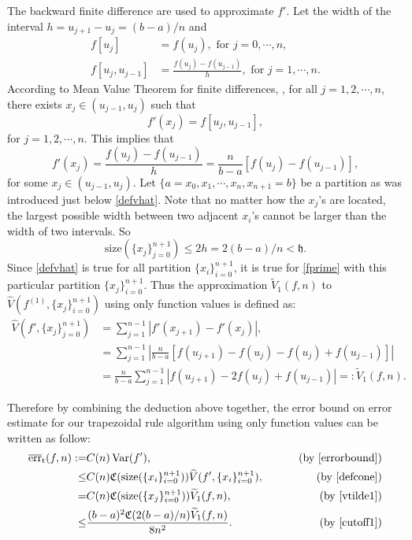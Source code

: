 \documentclass{iitthesis}
\DeclareMathOperator{\Var}{Var}
\theoremstyle{definition}
\theoremstyle{remark}
\begin{document}

The backward finite difference are used to approximate $f'$. Let the width of the interval $h=u_{j+1}-u_{j}=(b-a)/n$ and
\begin{align*}
  f[u_{j}]&=f(u_{j}), \text{ for } j=0,\cdots, n,\\
  f[u_{j},u_{j-1}]&=\frac{f(u_{j})-f(u_{j-1})}{h},\text{ for } j=1, \cdots, n.
\end{align*}
According to Mean Value Theorem for finite differences, , for all $j=1,2,\cdots,n$, there exists $x_j\in (u_{j-1},u_{j})$ such that
\begin{equation*}
   f'(x_j)= f[u_{j},u_{j-1}],
\end{equation*}
for $j = 1, 2, \cdots, n.$ This implies that
\begin{equation}\label{fprime}
  f'(x_j)=\frac{f(u_{j})-f(u_{j-1})}{h}=\frac{n}{b-a}[f(u_{j})-f(u_{j-1})],
\end{equation}
for some $x_j\in (u_{j-1},u_{j})$. Let $\{a=x_{0}, x_{1},\cdots,x_{n},x_{n+1}=b\}$ be a partition as was introduced just below \eqref{defvhat}. Note that no matter how the $x_j$'s are located, the largest possible width between two adjacent $x_{i}$'s cannot be larger than the width of two intervals. So
\begin{equation}\label{cutoff1}
  \text{size}(\{x_j\}_{j=0}^{n+1})\leq 2h=2(b-a)/n<\mathfrak{h}.
\end{equation}
Since \eqref{defvhat} is true for all partition $\{x_i\}_{i=0}^{n+1}$, it is true for \eqref{fprime} with this particular partition $\{x_j\}_{i=0}^{n+1}$. Thus the approximation $\widetilde{V}_1(f,n)$ to $\widehat{V}(f^{(1)},\{x_j\}_{i=0}^{n+1})$ using only function values is defined as:
\begin{align}\label{vtilde1}
\nonumber    \widehat{V}(f',\{x_j\}_{j=0}^{n+1})&= \sum_{j=1}^{n-1}\left|f'(x_{j+1})-f'(x_{j})\right|,\\
\nonumber    &=\sum_{j=1}^{n-1}\left|\frac{n}{b-a}[f(u_{j+1})-f(u_{j})-f(u_{j})+f(u_{j-1})]\right|\\
    &=\frac{n}{b-a}\sum_{j=1}^{n-1}\left|f(u_{j+1})-2f(u_{j})+f(u_{j-1})\right|=:\widetilde{V}_1(f,n).
\end{align}

Therefore by combining the deduction above together, the error bound on error estimate for our trapezoidal rule algorithm using only function values can be written as follow:
\begin{align*}
\overline{\text{err}}_{\text{t}}(f,n):=&C(n)\Var(f'),\qquad &\text{ (by \eqref{errorbound})}\\
\leq & C(n)\mathfrak{C}(\text{size}(\{x_i\}_{i=0}^{n+1}))\widehat{V}(f',\{x_i\}_{i=0}^{n+1}), \qquad &\text{ (by \eqref{defcone})}\\
=& C(n)\mathfrak{C}(\text{size}(\{x_j\}_{i=0}^{n+1}))\widetilde{V}_1(f,n), \qquad &\text{ (by \eqref{vtilde1})}\\
  \leq & \frac{(b-a)^2\mathfrak{C}(2(b-a)/n)\widetilde{V}_1(f,n)}{8n^2}.\qquad &\text{ (by \eqref{cutoff1})}
\end{align*}
\end{document}
